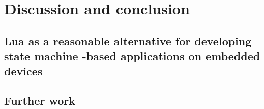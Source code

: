 \chapter{Discussion and conclusion}
\label{ch:discussion_conclusion}

\section{Lua as a reasonable alternative for developing state machine -based applications on embedded devices}

\section{Further work}